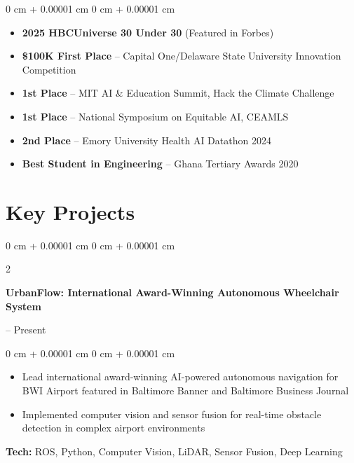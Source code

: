 \documentclass[10pt, letterpaper]{article}
\newenvironment{highlights}{
    \begin{itemize}[
        topsep=0.10 cm,
        parsep=0.10 cm,
        partopsep=0pt,
        itemsep=0pt,
        leftmargin=0 cm + 10pt
    ]
}{
    \end{itemize}
} %
\newenvironment{onecolentry}{
    \begin{adjustwidth}{
        0 cm + 0.00001 cm
    }{
        0 cm + 0.00001 cm
    }
}{
    \end{adjustwidth}
} %
\newenvironment{twocolentry}[2][]{
    \onecolentry
    \def\secondColumn{#2}
    \setcolumnwidth{\fill, 4.5 cm}
    \begin{paracol}{2}
}{
    \switchcolumn \raggedleft \secondColumn
    \end{paracol}
    \endonecolentry
} %
\begin{document}
    \begin{onecolentry}
        \begin{highlights}
            \item \textbf{2025 HBCUniverse 30 Under 30} (Featured in Forbes)
            \item \textbf{\$100K First Place} -- Capital One/Delaware State University Innovation Competition
            \item \textbf{1st Place} -- MIT AI \& Education Summit, Hack the Climate Challenge
            \item \textbf{1st Place} -- National Symposium on Equitable AI, CEAMLS
            \item \textbf{2nd Place} -- Emory University Health AI Datathon 2024
            \item \textbf{Best Student in Engineering} -- Ghana Tertiary Awards 2020
        \end{highlights}
    \end{onecolentry}



    \section{Key Projects}

        \begin{twocolentry}{
            2024 – Present
        }
            \textbf{UrbanFlow: International Award-Winning Autonomous Wheelchair System}
        \end{twocolentry}

        \vspace{0.10 cm}
        \begin{onecolentry}
            \begin{highlights}
                \item Lead international award-winning AI-powered autonomous navigation for BWI Airport featured in Baltimore Banner and Baltimore Business Journal
                \item Implemented computer vision and sensor fusion for real-time obstacle detection in complex airport environments
            \end{highlights}
            \vspace{0.05 cm}
            \textbf{Tech:} ROS, Python, Computer Vision, LiDAR, Sensor Fusion, Deep Learning
        \end{onecolentry}

        \vspace{0.2 cm}
\end{document}
